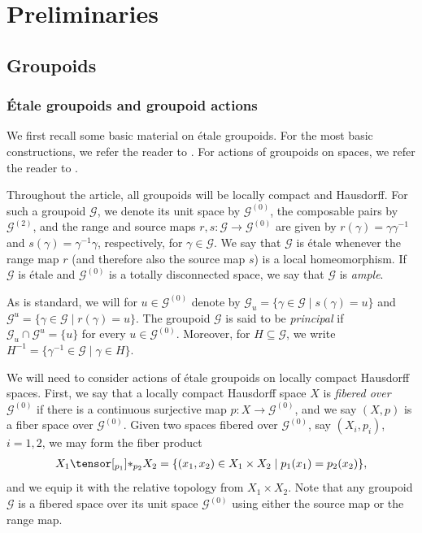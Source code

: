 \documentclass[11pt,a4paper,oneside,final,reqno]{amsart}
\theoremstyle{definition}
\newcommand{\G}{\mathcal{G}}
\newcommand{\Go}{\mathcal{G}^{(0)}}
\numberwithin{equation}{section}
\begin{document}
	
	\section{Preliminaries}\label{sec:prelims}
	
	\subsection{Groupoids}\label{sec:prelims-groupoids}
	\subsubsection*{\'Etale groupoids and groupoid actions}
	We first recall some basic material on \'etale groupoids. For the most basic constructions, we refer the reader to \cite{SimsSzaboWilliamsBook}. For actions of groupoids on spaces, we refer the reader to \cite{DelarocheExactGroupoidsV3}.
	
	Throughout the article, all groupoids will be  
	locally compact and Hausdorff. For such a groupoid $\G$, we denote its unit space by $\Go$, the composable pairs by  $\G^{(2)}$, and the range and source maps $r,s \colon \G \to \Go$ are given by $r(\gamma) = \gamma \gamma^{-1}$ and $s(\gamma) = \gamma^{-1}\gamma$, respectively, for $\gamma \in \G$. 
	We say that $\G$ is \'etale whenever the range map $r$ (and therefore also the source map $s$) is a local homeomorphism. 
	If $\G$ is \'etale and $\Go$ is a totally disconnected space, we say that $\G$ is \emph{ample}. 
	
	As is standard, we will for $u \in \Go$ denote by $\G_u = \{ \gamma \in \G \mid s(\gamma) = u \}$ and $\G^u = \{ \gamma \in \G \mid r(\gamma) = u \}$. The groupoid $\G$ is said to be \emph{principal} if $\G_u \cap \G^u = \{u\}$ for every $u \in \Go$.  Moreover, for $H \subseteq \G$, we write $H^{-1} = \{ \gamma^{-1} \in \G \mid \gamma \in H \}$. 
	
	
	We will need to consider actions of \'etale groupoids on locally compact Hausdorff spaces. First, we say that a locally compact Hausdorff space $X$ is \emph{fibered over} $\Go$ if there is a continuous surjective map $p \colon X \to \Go$, and we say $(X, p)$ is a fiber space over $\Go$. Given two spaces fibered over $\Go$, say $(X_i, p_i)$, $i=1,2$, we may form the fiber product
	\begin{align*}
		X_1 \tensor[_{p_{1}}]{*}{_{p_{2}}} X_2 = \{ (x_1, x_2) \in X_1 \times X_2 \mid p_1(x_1) = p_2(x_2)  \} ,
	\end{align*}
	and we equip it with the relative topology from $X_1 \times X_2$. Note that any groupoid $\G$ is a fibered space over its unit space $\Go$ using either the source map or the range map. 
\end{document}
